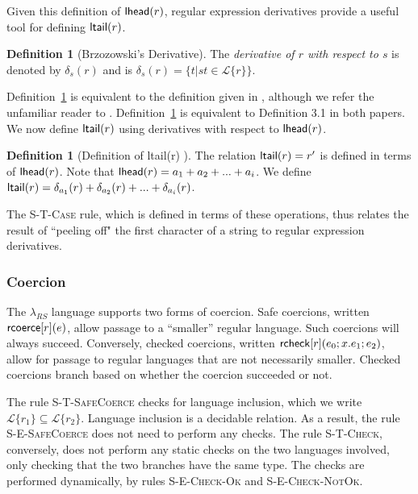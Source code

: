 \documentclass[9pt]{sig-alternate}
\theoremstyle{definition}
\newtheorem{defn}[thm]{Definition}
\newcommand{\Lagr}{\mathcal{L}}
\newcommand{\lang}[1]{\Lagr\{#1\}}
\newcommand{\lambdas}{\lambda_{RS}}
\newcommand{\rcoerce}[2]{{\sf rcoerce}[#1](#2)}
\newcommand{\rcheck}[4]{ {\sf rcheck}[#1](#2;#3;#4) }
\newcommand{\lhead}[1]{ {\sf lhead}(#1) }
\newcommand{\ltail}[1]{ {\sf ltail}(#1) }
\begin{document}
Given this definition of $\lhead{r}$, regular expression derivatives \cite{bowzer} provide a useful tool for defining $\ltail{r}$.
\begin{defn}[Brzozowski's Derivative]\label{def:derivative}
  The \emph{derivative of $r$ with respect to $s$} is denoted by $\delta_s(r)$
  and is $\delta_s(r) = \{t | st \in \lang{r}\}$.
\end{defn}

Definition~\ref{def:derivative} is equivalent to the definition given in \cite{bowzer},
although we refer the unfamiliar reader to \cite{owens}.
Definition~\ref{def:derivative} is equivalent to Definition 3.1 in both papers.
We now define $\ltail{r}$ using derivatives with respect to $\lhead{r}$.

\begin{defn}[Definition of \ltail{r}]
The relation $\ltail{r} = r'$ is defined in terms of $\lhead{r}$.
Note that $\lhead{r} = a_1 + a_2 + ... + a_i$.
We define $\ltail{r} = \delta_{a_1}(r) + \delta_{a_2}(r) + ... + \delta_{a_i}(r)$.
\end{defn}

The \textsc{S-T-Case} rule, which is defined in terms of these operations, thus relates the result of ``peeling off" the first character of a string to regular expression derivatives. 

\subsubsection{Coercion}

The $\lambdas$ language supports two forms of coercion. Safe coercions, written $\rcoerce{r}{e}$, allow passage to a ``smaller'' regular language. Such coercions will always succeed. 
Conversely, checked coercions, written $\rcheck{r}{e_0}{x.e_1}{e_2}$, 
allow for passage to regular languages that are not necessarily smaller. Checked coercions branch based on whether the coercion succeeded or not.

The rule 
 \textsc{S-T-SafeCoerce} checks for language inclusion, which we write $\lang{r_1} \subseteq \lang{r_2}$. Language inclusion is a decidable relation. As a result, the rule \textsc{S-E-SafeCoerce} does not need to perform any checks. The rule 
\textsc{S-T-Check}, conversely, does not perform any static checks on the two languages involved, only checking that the two branches have the same type. The checks are performed dynamically, by rules \textsc{S-E-Check-Ok} and \textsc{S-E-Check-NotOk}. 
\end{document}

